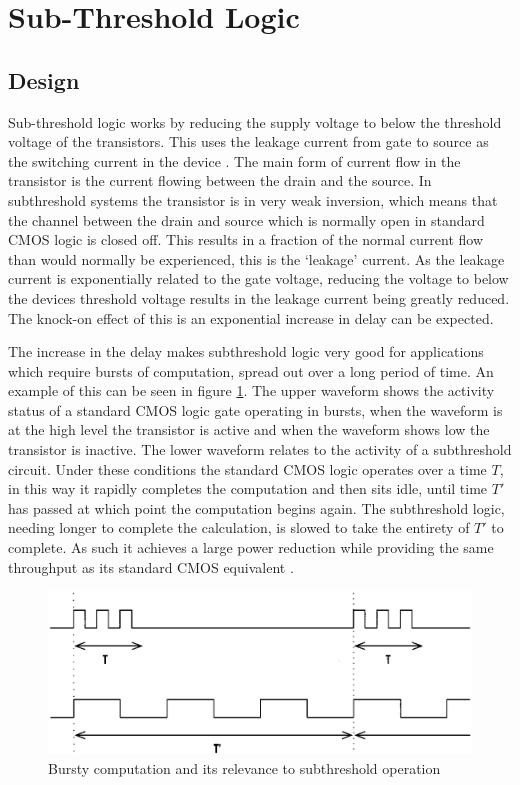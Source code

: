\section{Sub-Threshold Logic}
\label{sec:subthresh}

\subsection{Design}
Sub-threshold logic works by reducing the supply voltage to below the threshold voltage of the transistors.
This uses the leakage current from gate to source as the switching current in the device \cite{ULPSubThresh}.
The main form of current flow in the transistor is the current flowing between the drain and the source.
In subthreshold systems the transistor is in very weak inversion, which means that the channel between the drain and source which is normally open in standard CMOS logic is closed off.
This results in a fraction of the normal current flow than would normally be experienced, this is the `leakage' current.
As the leakage current is exponentially related to the gate voltage, reducing the voltage to below the devices threshold voltage results in the leakage current being greatly reduced.
The knock-on effect of this is an exponential increase in delay can be expected.

The increase in the delay makes subthreshold logic very good for applications which require bursts of computation, spread out over a long period of time.
An example of this can be seen in figure \ref{fig:burstST}.
The upper waveform shows the activity status of a standard CMOS logic gate operating in bursts, when the waveform is at the high level the transistor is active and when the waveform shows low the transistor is inactive.
The lower waveform relates to the activity of a subthreshold circuit.
Under these conditions the standard CMOS logic operates over a time $T$, in this way it rapidly completes the computation and then sits idle, until time $T'$ has passed at which point the computation begins again.
The subthreshold logic, needing longer to complete the calculation, is slowed to take the entirety of $T'$ to complete.
As such it achieves a large power reduction while providing the same throughput as its standard CMOS equivalent \cite{IEEEVLSIRobustSTL,ULPSubThresh}.

\begin{figure}
	\centering
	\includegraphics[width=\columnwidth]{../../images/burstycomputation.png}
	\caption{Bursty computation and its relevance to subthreshold operation \cite{IEEEVLSIRobustSTL}}
	\label{fig:burstST}
\end{figure}

